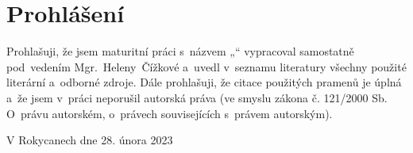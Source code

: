 \vspace*{\fill}

\chapter*{Prohlášení}

\begin{sloppypar}
Prohlašuji, že jsem maturitní práci s~názvem „\thetitle“ vypracoval samostatně pod~vedením \mbox{Mgr. Heleny Čížkové} a~uvedl v~seznamu literatury všechny použité literární a~odborné zdroje. Dále prohlašuji, že citace použitých pramenů je úplná a~že jsem v~práci neporušil autorská práva (ve smyslu zákona č. 121/2000 Sb. O~právu autorském, o~právech souvisejících s~právem autorským).
\end{sloppypar}

V Rokycanech dne 28. února 2023

\vspace*{1.5cm}

\begin{flushright}
    \hspace*{0.5\textwidth}\dotfill
    \\
    \theauthor\hspace*{0.05\textwidth}
\end{flushright}

\vspace*{1cm}

